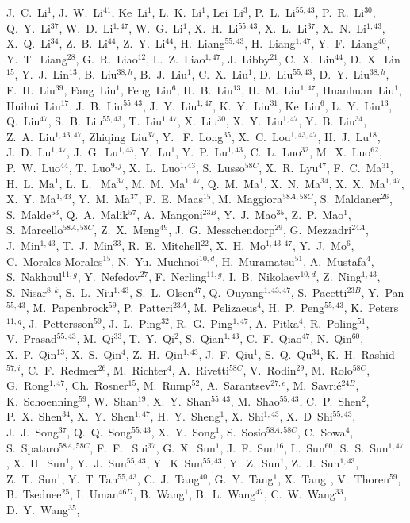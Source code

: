 \begin{small}
\begin{center}
J.~C.~Li$^{1}$, J.~W.~Li$^{41}$, Ke~Li$^{1}$, L.~K.~Li$^{1}$, Lei~Li$^{3}$, P.~L.~Li$^{55,43}$, P.~R.~Li$^{30}$, Q.~Y.~Li$^{37}$, W.~D.~Li$^{1,47}$, W.~G.~Li$^{1}$, X.~H.~Li$^{55,43}$, X.~L.~Li$^{37}$, X.~N.~Li$^{1,43}$, X.~Q.~Li$^{34}$, Z.~B.~Li$^{44}$, Z.~Y.~Li$^{44}$, H.~Liang$^{55,43}$, H.~Liang$^{1,47}$, Y.~F.~Liang$^{40}$, Y.~T.~Liang$^{28}$, G.~R.~Liao$^{12}$, L.~Z.~Liao$^{1,47}$, J.~Libby$^{21}$, C.~X.~Lin$^{44}$, D.~X.~Lin$^{15}$, Y.~J.~Lin$^{13}$, B.~Liu$^{38,h}$, B.~J.~Liu$^{1}$, C.~X.~Liu$^{1}$, D.~Liu$^{55,43}$, D.~Y.~Liu$^{38,h}$, F.~H.~Liu$^{39}$, Fang~Liu$^{1}$, Feng~Liu$^{6}$, H.~B.~Liu$^{13}$, H.~M.~Liu$^{1,47}$, Huanhuan~Liu$^{1}$, Huihui~Liu$^{17}$, J.~B.~Liu$^{55,43}$, J.~Y.~Liu$^{1,47}$, K.~Y.~Liu$^{31}$, Ke~Liu$^{6}$, L.~Y.~Liu$^{13}$, Q.~Liu$^{47}$, S.~B.~Liu$^{55,43}$, T.~Liu$^{1,47}$, X.~Liu$^{30}$, X.~Y.~Liu$^{1,47}$, Y.~B.~Liu$^{34}$, Z.~A.~Liu$^{1,43,47}$, Zhiqing~Liu$^{37}$, Y. ~F.~Long$^{35}$, X.~C.~Lou$^{1,43,47}$, H.~J.~Lu$^{18}$, J.~D.~Lu$^{1,47}$, J.~G.~Lu$^{1,43}$, Y.~Lu$^{1}$, Y.~P.~Lu$^{1,43}$, C.~L.~Luo$^{32}$, M.~X.~Luo$^{62}$, P.~W.~Luo$^{44}$, T.~Luo$^{9,j}$, X.~L.~Luo$^{1,43}$, S.~Lusso$^{58C}$, X.~R.~Lyu$^{47}$, F.~C.~Ma$^{31}$, H.~L.~Ma$^{1}$, L.~L. ~Ma$^{37}$, M.~M.~Ma$^{1,47}$, Q.~M.~Ma$^{1}$, X.~N.~Ma$^{34}$, X.~X.~Ma$^{1,47}$, X.~Y.~Ma$^{1,43}$, Y.~M.~Ma$^{37}$, F.~E.~Maas$^{15}$, M.~Maggiora$^{58A,58C}$, S.~Maldaner$^{26}$, S.~Malde$^{53}$, Q.~A.~Malik$^{57}$, A.~Mangoni$^{23B}$, Y.~J.~Mao$^{35}$, Z.~P.~Mao$^{1}$, S.~Marcello$^{58A,58C}$, Z.~X.~Meng$^{49}$, J.~G.~Messchendorp$^{29}$, G.~Mezzadri$^{24A}$, J.~Min$^{1,43}$, T.~J.~Min$^{33}$, R.~E.~Mitchell$^{22}$, X.~H.~Mo$^{1,43,47}$, Y.~J.~Mo$^{6}$, C.~Morales Morales$^{15}$, N.~Yu.~Muchnoi$^{10,d}$, H.~Muramatsu$^{51}$, A.~Mustafa$^{4}$, S.~Nakhoul$^{11,g}$, Y.~Nefedov$^{27}$, F.~Nerling$^{11,g}$, I.~B.~Nikolaev$^{10,d}$, Z.~Ning$^{1,43}$, S.~Nisar$^{8,k}$, S.~L.~Niu$^{1,43}$, S.~L.~Olsen$^{47}$, Q.~Ouyang$^{1,43,47}$, S.~Pacetti$^{23B}$, Y.~Pan$^{55,43}$, M.~Papenbrock$^{59}$, P.~Patteri$^{23A}$, M.~Pelizaeus$^{4}$, H.~P.~Peng$^{55,43}$, K.~Peters$^{11,g}$, J.~Pettersson$^{59}$, J.~L.~Ping$^{32}$, R.~G.~Ping$^{1,47}$, A.~Pitka$^{4}$, R.~Poling$^{51}$, V.~Prasad$^{55,43}$, M.~Qi$^{33}$, T.~Y.~Qi$^{2}$, S.~Qian$^{1,43}$, C.~F.~Qiao$^{47}$, N.~Qin$^{60}$, X.~P.~Qin$^{13}$, X.~S.~Qin$^{4}$, Z.~H.~Qin$^{1,43}$, J.~F.~Qiu$^{1}$, S.~Q.~Qu$^{34}$, K.~H.~Rashid$^{57,i}$, C.~F.~Redmer$^{26}$, M.~Richter$^{4}$, A.~Rivetti$^{58C}$, V.~Rodin$^{29}$, M.~Rolo$^{58C}$, G.~Rong$^{1,47}$, Ch.~Rosner$^{15}$, M.~Rump$^{52}$, A.~Sarantsev$^{27,e}$, M.~Savri\'e$^{24B}$, K.~Schoenning$^{59}$, W.~Shan$^{19}$, X.~Y.~Shan$^{55,43}$, M.~Shao$^{55,43}$, C.~P.~Shen$^{2}$, P.~X.~Shen$^{34}$, X.~Y.~Shen$^{1,47}$, H.~Y.~Sheng$^{1}$, X.~Shi$^{1,43}$, X.~D~Shi$^{55,43}$, J.~J.~Song$^{37}$, Q.~Q.~Song$^{55,43}$, X.~Y.~Song$^{1}$, S.~Sosio$^{58A,58C}$, C.~Sowa$^{4}$, S.~Spataro$^{58A,58C}$, F.~F. ~Sui$^{37}$, G.~X.~Sun$^{1}$, J.~F.~Sun$^{16}$, L.~Sun$^{60}$, S.~S.~Sun$^{1,47}$, X.~H.~Sun$^{1}$, Y.~J.~Sun$^{55,43}$, Y.~K~Sun$^{55,43}$, Y.~Z.~Sun$^{1}$, Z.~J.~Sun$^{1,43}$, Z.~T.~Sun$^{1}$, Y.~T~Tan$^{55,43}$, C.~J.~Tang$^{40}$, G.~Y.~Tang$^{1}$, X.~Tang$^{1}$, V.~Thoren$^{59}$, B.~Tsednee$^{25}$, I.~Uman$^{46D}$, B.~Wang$^{1}$, B.~L.~Wang$^{47}$, C.~W.~Wang$^{33}$, D.~Y.~Wang$^{35}$, 
\end{center}
\end{small}
